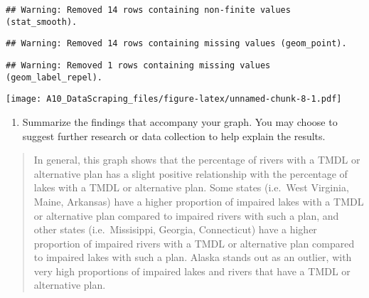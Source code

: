 \documentclass[]{article}
\providecommand{\tightlist}{%
  \setlength{\itemsep}{0pt}\setlength{\parskip}{0pt}}
\begin{document}
\begin{verbatim}
## Warning: Removed 14 rows containing non-finite values (stat_smooth).
\end{verbatim}

\begin{verbatim}
## Warning: Removed 14 rows containing missing values (geom_point).
\end{verbatim}

\begin{verbatim}
## Warning: Removed 1 rows containing missing values (geom_label_repel).
\end{verbatim}

\texttt{[image: A10\_DataScraping\_files/figure-latex/unnamed-chunk-8-1.pdf]}

\begin{enumerate}
\def\labelenumi{\arabic{enumi}.}
\setcounter{enumi}{11}
\tightlist
\item
  Summarize the findings that accompany your graph. You may choose to
  suggest further research or data collection to help explain the
  results.
\end{enumerate}

\begin{quote}
In general, this graph shows that the percentage of rivers with a TMDL
or alternative plan has a slight positive relationship with the
percentage of lakes with a TMDL or alternative plan. Some states
(i.e.~West Virginia, Maine, Arkansas) have a higher proportion of
impaired lakes with a TMDL or alternative plan compared to impaired
rivers with such a plan, and other states (i.e.~Missisippi, Georgia,
Connecticut) have a higher proportion of impaired rivers with a TMDL or
alternative plan compared to impaired lakes with such a plan. Alaska
stands out as an outlier, with very high proportions of impaired lakes
and rivers that have a TMDL or alternative plan.
\end{quote}
\end{document}
